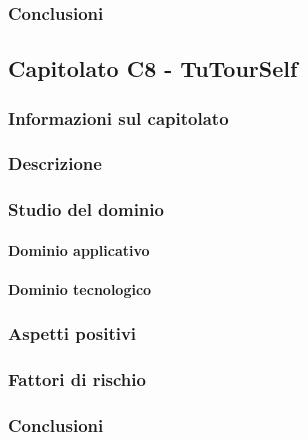 	\subsubsection{Conclusioni}
	
	\subsection{Capitolato C8 - TuTourSelf}
		\subsubsection{Informazioni sul capitolato}
		\subsubsection{Descrizione}
		\subsubsection{Studio del dominio}
			\paragraph{Dominio applicativo}
			\paragraph{Dominio tecnologico}
		\subsubsection{Aspetti positivi}
		\subsubsection{Fattori di rischio}
		\subsubsection{Conclusioni}
	
	
	